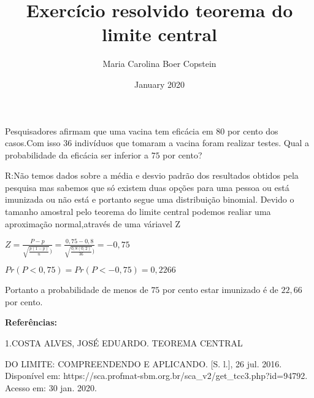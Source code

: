 \documentclass{article}
\title{Exercício resolvido teorema do limite central}
\author{Maria Carolina Boer Copstein}
\date{January 2020}
\begin{document}
\maketitle
Pesquisadores afirmam que uma vacina tem eficácia em $80$ por cento dos casos.Com isso 36 indivíduos que tomaram a vacina foram realizar testes. Qual a probabilidade da eficácia ser inferior a $75$ por cento? 

\hfill 

R:Não temos dados sobre a média e desvio padrão dos resultados obtidos pela pesquisa mas sabemos que só existem duas opções para uma pessoa ou está imunizada ou não está e portanto segue uma distribuição binomial. Devido o tamanho amostral pelo teorema do limite central podemos realiar uma aproximação normal,através de uma váriavel Z
\begin{center}
    $ Z=\frac{P-p}{\sqrt{\frac{p(1-p)}{n}})}=\frac{0,75-0,8}{\sqrt{\frac{0,8(0,2)}{36}})}= -0,75$
    
\hfill

    $Pr(P<0,75)=Pr(P< -0,75)=0,2266$
\end{center}
Portanto a probabilidade de menos de $75$ por cento estar imunizado é de $22,66$ por cento.

\hfill 

\textbf{Referências:} \

\hfill 

1.COSTA ALVES, JOSÉ EDUARDO. TEOREMA CENTRAL

\hfill 
DO LIMITE: COMPREENDENDO E APLICANDO. [S. l.], 26 jul. 2016. Disponível em: https://sca.profmat-sbm.org.br/sca\_v2/get\_tcc3.php?id=94792. Acesso em: 30 jan. 2020.
\end{document}
